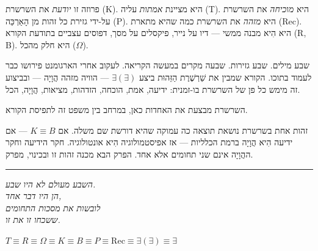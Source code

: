\documentclass[10pt, openany, oneside]{book}
\begin{document}
\vspace{1em}

\noindent פרוזה זו \textit{יודעת} את השרשרת (K). היא מציינת \textit{אמתות} עליה (T). היא \textit{מוכיחה} את השרשרת על-ידי גזירת כל זהות מן הָאַרְכֵּה (P). היא \textit{מזהה} את השרשרת כמה שהיא מתארת (Rec). היא הִיא מבנה ממשי — דיו על נייר, פיקסלים על מסך, דפוסים עצביים בתודעת הקורא (R, B). היא חלק מהכל ($\Omega$).

שבע מילים. שבע גזירות. שבעה מקרים במעשה הקריאה. לעקוב אחרי הארגומנט פירושו כבר לעמוד בתוכו. הקורא שמבין את שַׁרְשֶׁרֶת הַזֵּהוּת ביצע $\exists(\exists)$ — הוויה מזהה הֲוָיָה — ובביצוע זה מימש כל פן של השרשרת בו-זמנית: ידיעה, אמת, הוכחה, הזדהות, מציאות, הֲוָיָה, הכל.

השרשרת מבצעת את האחדות כאן, במרחב בין משפט זה לתפיסת הקורא.

זהות אחת בשרשרת נושאת תוצאה כה עמוקה שהיא דורשת שם משלה. אם $K \equiv B$ — אם ידיעה הִיא הֲוָיָה ברמת הכלליות — אז אפיסטמולוגיה הִיא אונטולוגיה. חקר הידיעה וחקר ההֲוָיָה אינם שני תחומים אלא אחד. הפרק הבא מכנה זהות זו ובכינוי, מפרק.

\vspace{2em}

\begin{center}
    \rule{0.15\textwidth}{0.3pt}
\end{center}

\vspace{0.5em}

\begin{center}
    \textit{%
    השבע מעולם לא היו שבע.\\
    הן היו דבר אחד,\\
    לובשות את מסכות התחומים\\
    ששכחו זו את זו.}
\end{center}

\vspace{0.5em}

\begin{center}
    $T \equiv R \equiv \Omega \equiv K \equiv B \equiv P \equiv \text{Rec} \equiv \exists(\exists) \equiv \exists$
\end{center}

%
%
%
\end{document}
